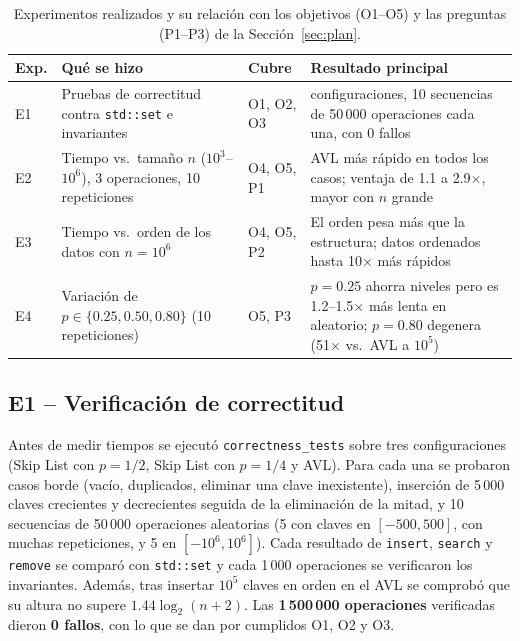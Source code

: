 \documentclass[11pt,a4paper]{article}
\begin{document}
\begin{table}[!htb]
\centering
\renewcommand{\arraystretch}{1.2}
\small
\begin{tabularx}{\textwidth}{l >{\raggedright\arraybackslash}p{3.6cm} l >{\raggedright\arraybackslash}X}
\toprule
\textbf{Exp.} & \textbf{Qué se hizo} & \textbf{Cubre} & \textbf{Resultado principal} \\
\midrule
E1 & Pruebas de correctitud contra \texttt{std::set} e invariantes
   & O1, O2, O3 & 3 configuraciones, 10 secuencias de 50\,000 operaciones cada una, con 0 fallos \\
E2 & Tiempo vs.\ tamaño $n$ ($10^3$--$10^6$), 3 operaciones, 10 repeticiones
   & O4, O5, P1 & AVL más rápido en todos los casos; ventaja de 1.1 a 2.9$\times$, mayor con $n$ grande \\
E3 & Tiempo vs.\ orden de los datos con $n=10^6$
   & O4, O5, P2 & El orden pesa más que la estructura; datos ordenados hasta 10$\times$ más rápidos \\
E4 & Variación de $p \in \{0.25, 0.50, 0.80\}$ (10 repeticiones)
   & O5, P3 & $p=0.25$ ahorra niveles pero es 1.2--1.5$\times$ más lenta en aleatorio; $p=0.80$ degenera (51$\times$ vs.\ AVL a $10^5$) \\
\bottomrule
\end{tabularx}
\caption{Experimentos realizados y su relación con los objetivos (O1--O5) y
las preguntas (P1--P3) de la Sección~\ref{sec:plan}.}
\label{tab:experimentos}
\end{table}

\subsection{E1 -- Verificación de correctitud}

Antes de medir tiempos se ejecutó \texttt{correctness\_tests} sobre tres
configuraciones (Skip List con $p=1/2$, Skip List con $p=1/4$ y AVL). Para cada
una se probaron casos borde (vacío, duplicados, eliminar una clave
inexistente), inserción de 5\,000 claves crecientes y decrecientes seguida de
la eliminación de la mitad, y 10 secuencias de 50\,000 operaciones aleatorias
(5 con claves en $[-500, 500]$, con muchas repeticiones, y 5 en
$[-10^6, 10^6]$). Cada resultado de \texttt{insert}, \texttt{search} y
\texttt{remove} se comparó con \texttt{std::set} y cada 1\,000 operaciones se
verificaron los invariantes. Además, tras insertar $10^5$ claves en orden en el
AVL se comprobó que su altura no supere $1.44\log_2(n+2)$. Las
\textbf{1\,500\,000 operaciones} verificadas dieron \textbf{0 fallos}, con lo
que se dan por cumplidos O1, O2 y O3.
\end{document}
